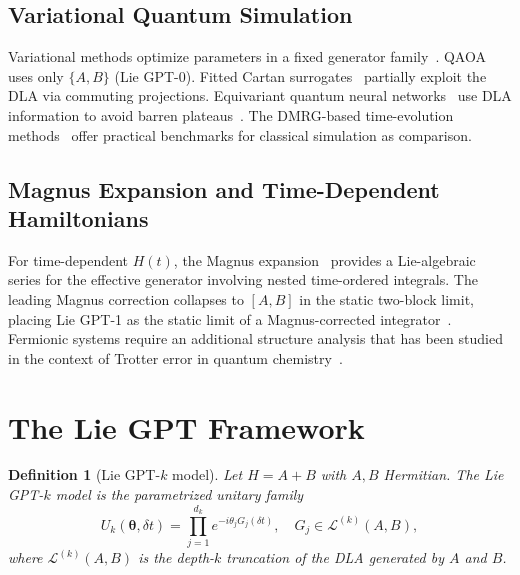\documentclass[aps,prxquantum,twocolumn,nofootinbib]{revtex4-2}
\newtheorem{definition}{Definition}
\begin{document}
\subsection{Variational Quantum Simulation}

Variational methods optimize parameters in a fixed generator
family~\cite{cirstoiu2020,wiersema2023}. QAOA uses only $\{A,B\}$
(Lie GPT-0). Fitted Cartan
surrogates~\cite{kokcu2022,steckmann2023,nakaji2023,miessen2023}
partially exploit the DLA via commuting projections. Equivariant
quantum neural networks~\cite{nguyen2022,icml_larocca2023,icml_schatzki2024,schatzki2022}
use DLA information to avoid barren
plateaus~\cite{larocca2023,ragone2023,anschuetz2022}.
The DMRG-based time-evolution methods~\cite{watson2023,chen2022a}
offer practical benchmarks for classical simulation as comparison.

\subsection{Magnus Expansion and Time-Dependent Hamiltonians}

For time-dependent $H(t)$, the Magnus
expansion~\cite{sharma2024,fang2025,tran2021,su2021} provides a
Lie-algebraic series for the effective generator involving nested
time-ordered integrals. The leading Magnus correction collapses to
$[A,B]$ in the static two-block limit, placing Lie GPT-1 as the
static limit of a Magnus-corrected integrator~\cite{liang2026}.
Fermionic systems require an additional structure analysis that has
been studied in the context of Trotter error in quantum
chemistry~\cite{babbush2023,dossantos2025,peng2025}.

\section{The Lie GPT Framework}
\label{sec:framework}

\begin{definition}[Lie GPT-$k$ model]
  \label{def:liegpt-k}
  Let $H = A + B$ with $A,B$ Hermitian. The Lie GPT-$k$ model is the
  parametrized unitary family
  \begin{equation}
    U_k(\bm{\theta},\delta t)
    = \prod_{j=1}^{d_k} e^{-i\theta_j G_j(\delta t)},
    \quad G_j \in \mathcal{L}^{(k)}(A,B),
    \label{eq:liegpt-k}
  \end{equation}
  where $\mathcal{L}^{(k)}(A,B)$ is the depth-$k$ truncation of the
  DLA generated by $A$ and $B$.
\end{definition}
\end{document}
